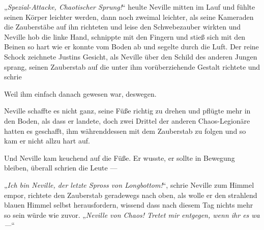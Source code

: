 „\emph{Spezial-Attacke, Chaotischer Sprung!}“ heulte Neville mitten im Lauf und fühlte seinen Körper leichter werden, dann noch zweimal leichter, als seine Kameraden die Zauberstäbe auf ihn richteten und leise den Schwebezauber wirkten und Neville hob die linke Hand, schnippte mit den Fingern und stieß sich mit den Beinen so hart wie er konnte vom Boden ab und segelte durch die Luft. Der reine Schock zeichnete Justins Gesicht, als Neville über den Schild des anderen Jungen sprang, seinen Zauberstab auf die unter ihm vorüberziehende Gestalt richtete und schrie 

Weil ihm einfach danach gewesen war, deswegen.

Neville schaffte es nicht ganz, seine Füße richtig zu drehen und pflügte mehr in den Boden, als dass er landete, doch zwei Drittel der anderen Chaos-Legionäre hatten es geschafft, ihm währenddessen mit dem Zauberstab zu folgen und so kam er nicht allzu hart auf.

Und Neville kam keuchend auf die Füße. Er wusste, er sollte in Bewegung bleiben, überall schrien die Leute  —

„\emph{Ich bin Neville, der letzte Spross von Longbottom!}“, schrie Neville zum Himmel empor, richtete den Zauberstab geradewegs nach oben, als wolle er den strahlend blauen Himmel selbst herausfordern, wissend dass nach diesem Tag nichts mehr so sein würde wie zuvor.
„\emph{Neville von Chaos! Tretet mir entgegen, wenn ihr es wa —}“

